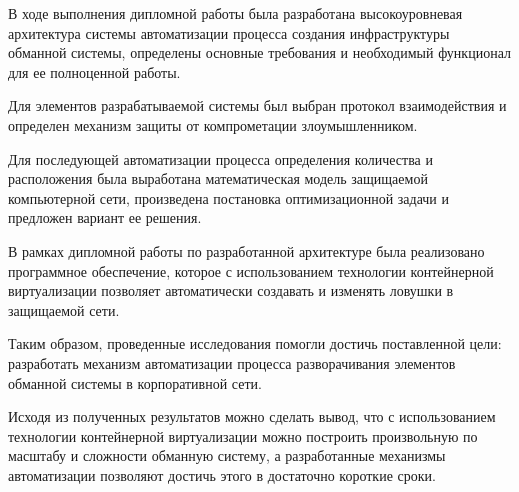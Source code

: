 
В ходе выполнения дипломной работы была разработана высокоуровневая архитектура системы автоматизации процесса создания инфраструктуры обманной системы, определены основные требования и необходимый функционал для ее полноценной работы.

Для элементов разрабатываемой системы был выбран протокол взаимодействия и определен механизм защиты от компрометации злоумышленником.

Для последующей автоматизации процесса определения количества и расположения была выработана математическая модель защищаемой компьютерной сети, произведена постановка оптимизационной задачи и предложен вариант ее решения.

В рамках дипломной работы по разработанной архитектуре была реализовано программное обеспечение, которое с использованием технологии контейнерной виртуализации позволяет автоматически создавать и изменять ловушки в защищаемой сети.

Таким образом, проведенные исследования помогли достичь  поставленной цели: разработать механизм автоматизации процесса разворачивания элементов обманной системы в корпоративной сети.

Исходя из полученных результатов можно сделать вывод, что с использованием технологии контейнерной виртуализации можно построить произвольную по масштабу и сложности обманную систему, а разработанные механизмы автоматизации позволяют достичь этого в достаточно короткие сроки.